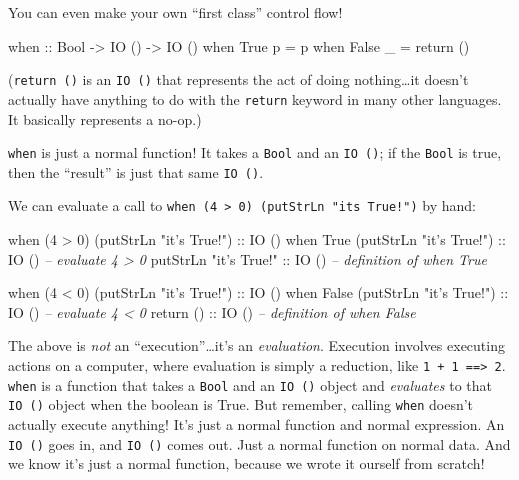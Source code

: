 \documentclass[]{article}
\newenvironment{Shaded}{}{}
\newcommand{\DataTypeTok}[1]{\textcolor[rgb]{0.56,0.13,0.00}{{#1}}}
\newcommand{\DecValTok}[1]{\textcolor[rgb]{0.25,0.63,0.44}{{#1}}}
\newcommand{\StringTok}[1]{\textcolor[rgb]{0.25,0.44,0.63}{{#1}}}
\newcommand{\CommentTok}[1]{\textcolor[rgb]{0.38,0.63,0.69}{\textit{{#1}}}}
\newcommand{\OtherTok}[1]{\textcolor[rgb]{0.00,0.44,0.13}{{#1}}}
\newcommand{\FunctionTok}[1]{\textcolor[rgb]{0.02,0.16,0.49}{{#1}}}
\newcommand{\NormalTok}[1]{{#1}}
\begin{document}
You can even make your own ``first class'' control flow!

\begin{Shaded}
\begin{Highlighting}[]
\OtherTok{when ::} \DataTypeTok{Bool} \OtherTok{->} \DataTypeTok{IO} \NormalTok{() }\OtherTok{->} \DataTypeTok{IO} \NormalTok{()}
\NormalTok{when }\DataTypeTok{True}  \NormalTok{p }\FunctionTok{=} \NormalTok{p}
\NormalTok{when }\DataTypeTok{False} \NormalTok{_ }\FunctionTok{=} \NormalTok{return ()}
\end{Highlighting}
\end{Shaded}

(\texttt{return\ ()} is an \texttt{IO\ ()} that represents the act of
doing nothing\ldots{}it doesn't actually have anything to do with the
\texttt{return} keyword in many other languages. It basically represents
a no-op.)

\texttt{when} is just a normal function! It takes a \texttt{Bool} and an
\texttt{IO\ ()}; if the \texttt{Bool} is true, then the ``result'' is
just that same \texttt{IO\ ()}.

We can evaluate a call to
\texttt{when\ (4\ \textgreater{}\ 0)\ (putStrLn\ "it\textquotesingle{}s\ True!")}
by hand:

\begin{Shaded}
\begin{Highlighting}[]
\NormalTok{when (}\DecValTok{4} \FunctionTok{>} \DecValTok{0}\NormalTok{) (putStrLn }\StringTok{"it's True!"}\NormalTok{)}\OtherTok{ ::} \DataTypeTok{IO} \NormalTok{()}
\NormalTok{when }\DataTypeTok{True} \NormalTok{(putStrLn }\StringTok{"it's True!"}\NormalTok{)}\OtherTok{    ::} \DataTypeTok{IO} \NormalTok{()  }\CommentTok{-- evaluate 4 > 0}
\NormalTok{putStrLn }\StringTok{"it's True!"}\OtherTok{                ::} \DataTypeTok{IO} \NormalTok{()  }\CommentTok{-- definition of when True}

\NormalTok{when (}\DecValTok{4} \FunctionTok{<} \DecValTok{0}\NormalTok{) (putStrLn }\StringTok{"it's True!"}\NormalTok{)}\OtherTok{ ::} \DataTypeTok{IO} \NormalTok{()}
\NormalTok{when }\DataTypeTok{False} \NormalTok{(putStrLn }\StringTok{"it's True!"}\NormalTok{)}\OtherTok{   ::} \DataTypeTok{IO} \NormalTok{()  }\CommentTok{-- evaluate 4 < 0}
\NormalTok{return}\OtherTok{ ()                            ::} \DataTypeTok{IO} \NormalTok{()  }\CommentTok{-- definition of when False}
\end{Highlighting}
\end{Shaded}

The above is \emph{not} an ``execution''\ldots{}it's an
\emph{evaluation}. Execution involves executing actions on a computer,
where evaluation is simply a reduction, like
\texttt{1\ +\ 1\ ==\textgreater{}\ 2}. \texttt{when} is a function that
takes a \texttt{Bool} and an \texttt{IO\ ()} object and \emph{evaluates}
to that \texttt{IO\ ()} object when the boolean is True. But remember,
calling \texttt{when} doesn't actually execute anything! It's just a
normal function and normal expression. An \texttt{IO\ ()} goes in, and
\texttt{IO\ ()} comes out. Just a normal function on normal data. And we
know it's just a normal function, because we wrote it ourself from
scratch!
\end{document}
